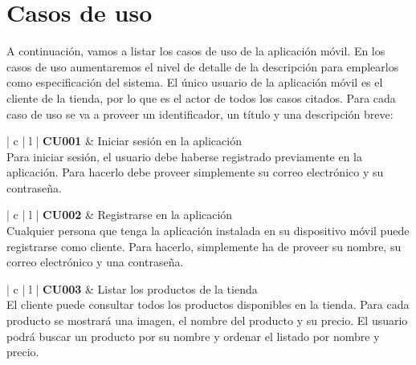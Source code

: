 \documentclass[11pt,spanish,listoffigures]{tfgetsinf}
\begin{document}
\section{Casos de uso} \label{sect:CUs}

A continuación, vamos a listar los casos de uso de la aplicación móvil. En los casos de uso aumentaremos el nivel de detalle de la descripción para emplearlos como especificación del sistema. El único usuario de la aplicación móvil es el cliente de la tienda, por lo que es el actor de todos los casos citados. Para cada caso de uso se va a proveer un identificador, un título y una descripción breve:

\begin{center}
\begin{tabular}{ | c | l | }
\hline
\textbf{ CU001 } & Iniciar sesión en la aplicación \\
\hline
{}
{
Para iniciar sesión, el usuario debe haberse registrado previamente en la aplicación. Para hacerlo debe proveer simplemente su correo electrónico y su contraseña.
} \\
\hline
\end{tabular}
\end{center}

\begin{center}
\begin{tabular}{ | c | l | }
\hline
\textbf{ CU002 } & Registrarse en la aplicación \\
\hline
{}
{
Cualquier persona que tenga la aplicación instalada en su dispositivo móvil puede registrarse como cliente. Para hacerlo, simplemente ha de proveer su nombre, su correo electrónico y una contraseña.
} \\
\hline
\end{tabular}
\end{center}

\begin{center}
\begin{tabular}{ | c | l | }
\hline
\textbf{ CU003 } & Listar los productos de la tienda \\
\hline
{}
{
El cliente puede consultar todos los productos disponibles en la tienda. Para cada producto se mostrará una imagen, el nombre del producto y su precio. El usuario podrá buscar un producto por su nombre y ordenar el listado por nombre y precio.
} \\
\hline
\end{tabular}
\end{center}
\end{document}
